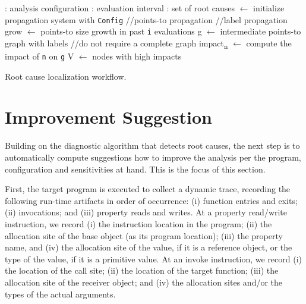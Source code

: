 \begin{algorithm}[th!]
	\begin{algorithmic}[1]
		{
			\renewcommand{\algorithmicrequire}{\textbf{Input:}}
			\renewcommand{\algorithmicensure}{\textbf{Output:}}
			: analysis configuration
			: evaluation interval
			: set of root causes
			 $\leftarrow$ initialize propagation system with {\tt Config}
			 //points-to propagation
			 //label propagation
			\ENDFOR
			\STATE  grow $\leftarrow$ points-to size growth in past {\tt i} evaluations
			\STATE g $\leftarrow$ intermediate points-to graph with labels //do not require a complete graph
			\STATE impact\textsubscript{n} $\leftarrow$ compute the impact of {\tt n} on {\tt g}
			\ENDFOR
			\STATE V $\leftarrow$ nodes with high impacts
			\RETURN
			\ENDIF
			\ENDIF
			\ENDWHILE
		}
	\end{algorithmic}
	\caption{Root cause localization workflow.}
	\label{alg:localization}
\end{algorithm}


\section{Improvement Suggestion}

Building on the diagnostic algorithm that detects root causes, the next 
step is to automatically compute suggestions how to improve the analysis per the program, configuration and sensitivities at hand. This is the focus of this section.

First, the target program is executed to collect a dynamic trace, recording the following run-time artifacts in order of occurrence: (i) function entries and exits; (ii) invocations; and (iii) property reads and writes. At a property read/write instruction, we record (i) the instruction location in the program; (ii) the allocation site of the base object (as its program location); (iii) the property name, and (iv) the allocation site of the value, if it is a reference object, or the type of the value, if it is a primitive value. At an invoke instruction, we record (i) the location of the call site; (ii) the location of the target function; (iii) the allocation site of the receiver object; and (iv) the allocation sites and/or the types of the actual arguments. 

